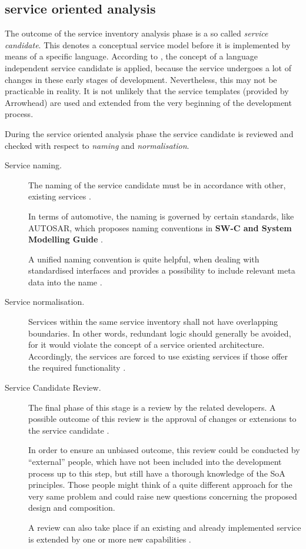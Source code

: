 \subsection{service oriented analysis}

The outcome of the service inventory analysis phase is a so called \emph{service candidate}. This denotes a conceptual service model before it is implemented by means of a specific language. According to \cite[p.42]{erl2011}, the concept of a language independent service candidate is applied, because the service undergoes a lot of changes in these early stages of development. Nevertheless, this may not be practicable in reality. It is not unlikely that the service templates (provided by Arrowhead) are used and extended from the very beginning of the development process.

During the service oriented analysis phase the service candidate is reviewed and checked with respect to \emph{naming} and \emph{normalisation}.

\begin{description}
	\item [Service naming.]
	The naming of the service candidate must be in accordance with other, existing services \cite[p.206]{erl2011}.

	In terms of automotive, the naming is governed by certain standards, like \mbox{AUTOSAR}, which proposes naming conventions in \textbf{SW-C and System Modelling Guide} \cite{autosar_system_modelling}.

	A unified naming convention is quite helpful, when dealing with standardised interfaces and provides a possibility to include relevant meta data into the name \cite{rehner2013}.

	\item [Service normalisation.]
	Services within the same service inventory shall not have overlapping boundaries. In other words, redundant logic should generally be avoided, for it would violate the concept of a service oriented architecture. Accordingly, the services are forced to use existing services if those offer the required functionality \cite[p.207]{erl2011}.

	\item [Service Candidate Review.]
	The final phase of this stage is a review by the related developers. A possible outcome of this review is the approval of changes or extensions to the service candidate \cite[p.210]{erl2011}.

	In order to ensure an unbiased outcome, this review could be conducted by ``external'' people, which have not been included into the development process up to this step, but still have a thorough knowledge of the SoA principles. Those people might think of a quite different approach for the very same problem and could raise new questions concerning the proposed design and composition.

	A review can also take place if an existing and already implemented service is extended by one or more new capabilities \cite[p.210]{erl2011}.
\end{description}




